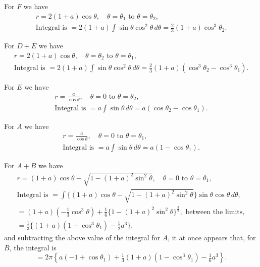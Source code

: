\documentclass[11pt,a4paper]{article}
\theoremstyle{definition}
\begin{document}
\newpage
\noindent
For $F$ we have
\begin{gather*}
r = 2(1+a)\cos\theta, \quad \theta=\theta_1 \text{ to } \theta=\theta_2,\\
\text{Integral is } = 2(1+a)\int \sin\theta\cos^2\theta\,d\theta
= \tfrac23(1+a)\cos^3\theta_2.
\end{gather*}

For $D+E$ we have
\begin{gather*}
r = 2(1+a)\cos\theta, \quad \theta=\theta_2 \text{ to } \theta=\theta_1,\\
\text{Integral is } = 2(1+a)\int \sin\theta\cos^2\theta\,d\theta
= \tfrac23(1+a)(\cos^3\theta_2 - \cos^3\theta_1).
\end{gather*}

For $E$ we have
\begin{gather*}
r = \frac{a}{\cos\theta}, \quad \theta=0 \text{ to } \theta=\theta_2,\\
\text{Integral is } = a\int \sin\theta\,d\theta = a(\cos\theta_2 - \cos\theta_1).
\end{gather*}

For $A$ we have
\begin{gather*}
r = \frac{a}{\cos\theta}, \quad \theta=0 \text{ to } \theta=\theta_1,\\
\text{Integral is } = a\int \sin\theta\,d\theta = a(1 - \cos\theta_1).
\end{gather*}

For $A+B$ we have
\begin{gather*}
r = (1+a)\cos\theta - \sqrt{1-(1+a)^2\sin^2\theta},
\quad \theta=0 \text{ to } \theta=\theta_1,\\
\text{Integral is } = \int\{(1+a)\cos\theta - \sqrt{1-(1+a)^2\sin^2\theta}\}\sin\theta\cos\theta\,d\theta,\\
= (1+a)\left(-\tfrac13\cos^3\theta\right) + \tfrac16\{1-(1+a)^2\sin^2\theta\}^{\frac32},
\text{ between the limits},\\
= \tfrac13\{(1+a)(1-\cos^3\theta_1) - \tfrac12 a^3\},
\end{gather*}
and subtracting the above value of the integral for $A$, it at once appears that, for $B$,
the integral is
\[
= 2\pi\left\{a(-1+\cos\theta_1) + \tfrac13(1+a)(1-\cos^3\theta_1) - \tfrac16 a^3\right\}.
\]
\end{document}
